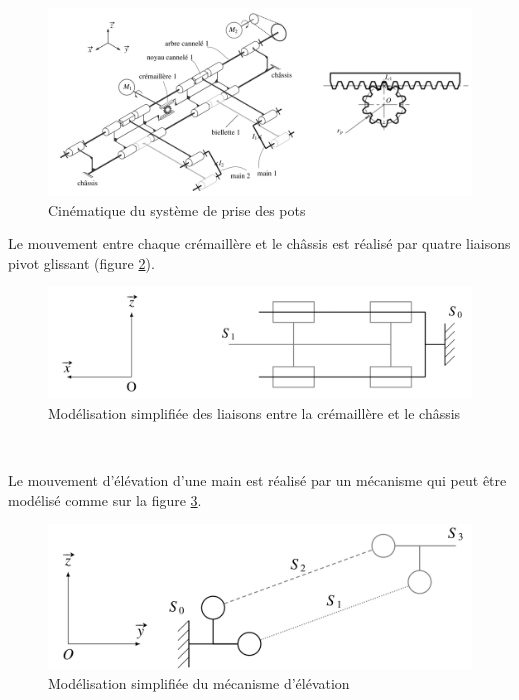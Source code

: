 
\begin{figure}[ht!]
\begin{center}
 \includegraphics[width=0.9\linewidth]{img/fig11}
\end{center}
\caption{Cinématique du système de prise des pots}
\label{fig11}
\end{figure}

\newpage

Le mouvement entre chaque crémaillère et le châssis est réalisé par quatre liaisons pivot glissant (figure \ref{fig12}).

\begin{figure}[ht!]
\begin{center}
 \includegraphics[width=0.6\linewidth]{img/fig12}
\end{center}
\caption{Modélisation simplifiée des liaisons entre la crémaillère et le châssis}
\label{fig12}
\end{figure}


~\

Le mouvement d'élévation d'une main est réalisé par un mécanisme qui peut être modélisé comme sur la figure \ref{fig13}.

\begin{figure}[ht!]
\begin{center}
 \includegraphics[width=0.6\linewidth]{img/fig13}
\end{center}
\caption{Modélisation simplifiée du mécanisme d'élévation}
\label{fig13}
\end{figure}

